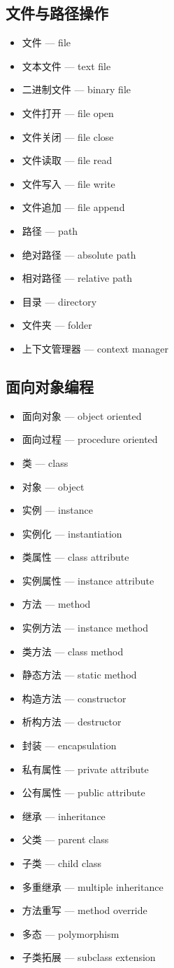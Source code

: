 \subsection{文件与路径操作}
\begin{itemize}
\item 文件 — file
\item 文本文件 — text file
\item 二进制文件 — binary file
\item 文件打开 — file open
\item 文件关闭 — file close
\item 文件读取 — file read
\item 文件写入 — file write
\item 文件追加 — file append
\item 路径 — path
\item 绝对路径 — absolute path
\item 相对路径 — relative path
\item 目录 — directory
\item 文件夹 — folder
\item 上下文管理器 — context manager
\end{itemize}

\subsection{面向对象编程}
\begin{itemize}
\item 面向对象 — object oriented
\item 面向过程 — procedure oriented
\item 类 — class
\item 对象 — object
\item 实例 — instance
\item 实例化 — instantiation
\item 类属性 — class attribute
\item 实例属性 — instance attribute
\item 方法 — method
\item 实例方法 — instance method
\item 类方法 — class method
\item 静态方法 — static method
\item 构造方法 — constructor
\item 析构方法 — destructor
\item 封装 — encapsulation
\item 私有属性 — private attribute
\item 公有属性 — public attribute
\item 继承 — inheritance
\item 父类 — parent class
\item 子类 — child class
\item 多重继承 — multiple inheritance
\item 方法重写 — method override
\item 多态 — polymorphism
\item 子类拓展 — subclass extension
\end{itemize}

